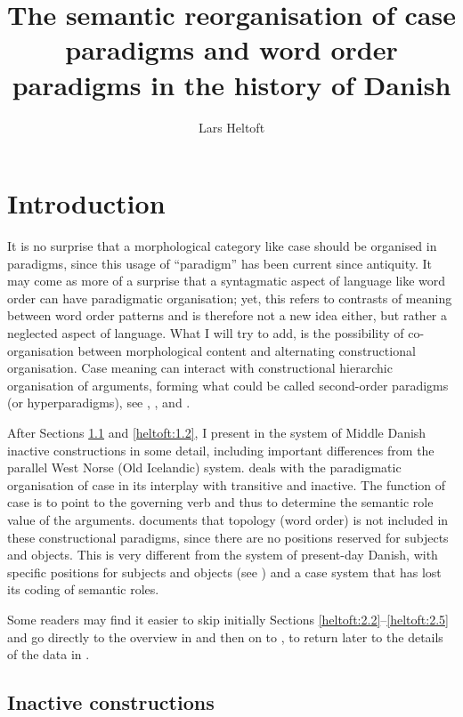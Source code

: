 \documentclass[output=paper]{langscibook}
\author{Lars Heltoft\affiliation{University of Copenhagen}}
\title[Semantic reorganisation of case paradigms]{The semantic reorganisation of case paradigms and word order paradigms in the history of Danish}
\begin{document}
\maketitle 
\largerpage[-2]

\section{Introduction} \label{heltoft:1}

It is no surprise that a morphological category like case should be organised in paradigms, since this usage of ``paradigm'' has been current since antiquity. It may come as more of a surprise that a syntagmatic aspect of language like word order can have paradigmatic organisation; yet, this refers to contrasts of meaning between word order patterns and is therefore not a new idea either, but rather a neglected aspect of language. What I will try to add, is the possibility of co-organisation between morphological content and alternating constructional organisation. Case meaning can interact with constructional hierarchic organisation of arguments, forming what could be called second-order paradigms (or hyperparadigms), see \citet{Christensen2007}, \citet{Nørgård-Sørensen2011}, and \citet{Nielsen2016}.

After Sections \ref{heltoft:1.1} and \ref{heltoft:1.2}, I present in  the system of Middle Danish inactive constructions in some detail, including  important differences from the parallel West Norse (Old Icelandic) system.  deals with the paradigmatic organisation of case in its interplay with transitive and inactive. The function of case is to point to the governing verb and thus to determine the semantic role value of the arguments.  documents that topology (word order) is not included in these constructional paradigms, since there are no positions reserved for subjects and objects. This is very different from the system of present-day Danish, with specific positions for subjects and objects (see ) and a case system that has lost its coding of semantic roles.

Some readers may find it easier to skip initially Sections \ref{heltoft:2.2}--\ref{heltoft:2.5} and go directly to the overview in  and then on to , to return later to the details of the data in .

\subsection{Inactive constructions} \label{heltoft:1.1}\largerpage[2]
\end{document}
